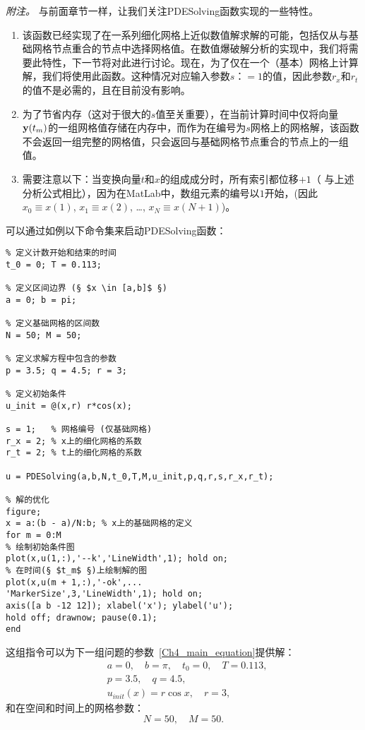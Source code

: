 \documentclass[twoside]{book}
\def\textbf{\bf}%
\begin{document}
\begin{CJK*}{GBK}{song}
\emph{附注。} 与前面章节一样，让我们关注PDESolving函数实现的一些特性。

\begin{enumerate}
	\item 该函数已经实现了在一系列细化网格上近似数值解求解的可能，包括仅从与基础网格节点重合的节点中选择网格值。在数值爆破解分析的实现中，我们将需要此特性，下一节将对此进行讨论。现在，为了仅在一个（基本）网格上计算解，我们将使用此函数。这种情况对应输入参数$s：= 1$的值，因此参数$r_x$和$r_t$的值不是必需的，且在目前没有影响。
	\item 为了节省内存（这对于很大的$s$值至关重要），在当前计算时间中仅将向量$\emph{\textbf{y}}(t_m)$的一组网格值存储在内存中，而作为在编号为$s$网格上的网格解，该函数不会返回一组完整的网格值，只会返回与基础网格节点重合的节点上的一组值。
	\item 需要注意以下：当变换向量$t$和$x$的组成成分时，所有索引都位移$+1$（ 与上述分析公式相比），因为在MatLab中，数组元素的编号以$1$开始，(因此 $x_0 \equiv x(1)$, $x_1 \equiv x(2)$, \ldots, $x_N \equiv x(N + 1)$)。
\end{enumerate}

可以通过如例以下命令集来启动PDESolving函数：
%
\begin{lstlisting}
% 定义计数开始和结束的时间
t_0 = 0; T = 0.113;

% 定义区间边界 (§ $x \in [a,b]$ §)
a = 0; b = pi;

% 定义基础网格的区间数
N = 50; M = 50;

% 定义求解方程中包含的参数
p = 3.5; q = 4.5; r = 3;

% 定义初始条件
u_init = @(x,r) r*cos(x);

s = 1;   % 网格编号 (仅基础网格)
r_x = 2; % x上的细化网格的系数
r_t = 2; % t上的细化网格的系数

u = PDESolving(a,b,N,t_0,T,M,u_init,p,q,r,s,r_x,r_t);

% 解的优化
figure;
x = a:(b - a)/N:b; % x上的基础网格的定义
for m = 0:M
% 绘制初始条件图
plot(x,u(1,:),'--k','LineWidth',1); hold on;
% 在时间(§ $t_m$ §)上绘制解的图
plot(x,u(m + 1,:),'-ok',...
'MarkerSize',3,'LineWidth',1); hold on;
axis([a b -12 12]); xlabel('x'); ylabel('u');
hold off; drawnow; pause(0.1);
end
\end{lstlisting}



这组指令可以为下一组问题的参数~\eqref{Ch4_main_equation}提供解：
\begin{equation}
\label{Ch4_parameters_4_1_a}
\begin{aligned}
&a = 0, \quad b = \pi, \quad t_0 = 0, \quad T = 0.113, \\
&p = 3.5, \quad q = 4.5, \\
&u_{init}(x) = r \cos x, \quad r = 3,
\end{aligned}
\end{equation}
和在空间和时间上的网格参数：
\begin{equation}
\label{Ch4_parameters_4_1_b}
N = 50, \quad M = 50.
\end{equation}



\end{CJK*}
\end{document}
